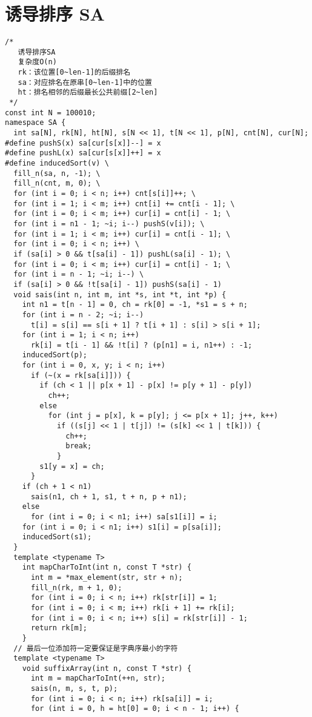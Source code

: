 \section{ 诱导排序 SA}
\begin{lstlisting}
/*
   诱导排序SA
   复杂度O(n)
   rk：该位置[0~len-1]的后缀排名
   sa：对应排名在原串[0~len-1]中的位置
   ht：排名相邻的后缀最长公共前缀[2~len]
 */
const int N = 100010;
namespace SA {
  int sa[N], rk[N], ht[N], s[N << 1], t[N << 1], p[N], cnt[N], cur[N];
#define pushS(x) sa[cur[s[x]]--] = x
#define pushL(x) sa[cur[s[x]]++] = x
#define inducedSort(v) \
  fill_n(sa, n, -1); \
  fill_n(cnt, m, 0); \
  for (int i = 0; i < n; i++) cnt[s[i]]++; \
  for (int i = 1; i < m; i++) cnt[i] += cnt[i - 1]; \
  for (int i = 0; i < m; i++) cur[i] = cnt[i] - 1; \
  for (int i = n1 - 1; ~i; i--) pushS(v[i]); \
  for (int i = 1; i < m; i++) cur[i] = cnt[i - 1]; \
  for (int i = 0; i < n; i++) \
  if (sa[i] > 0 && t[sa[i] - 1]) pushL(sa[i] - 1); \
  for (int i = 0; i < m; i++) cur[i] = cnt[i] - 1; \
  for (int i = n - 1; ~i; i--) \
  if (sa[i] > 0 && !t[sa[i] - 1]) pushS(sa[i] - 1)
  void sais(int n, int m, int *s, int *t, int *p) {
    int n1 = t[n - 1] = 0, ch = rk[0] = -1, *s1 = s + n;
    for (int i = n - 2; ~i; i--)
      t[i] = s[i] == s[i + 1] ? t[i + 1] : s[i] > s[i + 1];
    for (int i = 1; i < n; i++)
      rk[i] = t[i - 1] && !t[i] ? (p[n1] = i, n1++) : -1;
    inducedSort(p);
    for (int i = 0, x, y; i < n; i++)
      if (~(x = rk[sa[i]])) {
        if (ch < 1 || p[x + 1] - p[x] != p[y + 1] - p[y])
          ch++;
        else
          for (int j = p[x], k = p[y]; j <= p[x + 1]; j++, k++)
            if ((s[j] << 1 | t[j]) != (s[k] << 1 | t[k])) {
              ch++;
              break;
            }
        s1[y = x] = ch;
      }
    if (ch + 1 < n1)
      sais(n1, ch + 1, s1, t + n, p + n1);
    else
      for (int i = 0; i < n1; i++) sa[s1[i]] = i;
    for (int i = 0; i < n1; i++) s1[i] = p[sa[i]];
    inducedSort(s1);
  }
  template <typename T>
    int mapCharToInt(int n, const T *str) {
      int m = *max_element(str, str + n);
      fill_n(rk, m + 1, 0);
      for (int i = 0; i < n; i++) rk[str[i]] = 1;
      for (int i = 0; i < m; i++) rk[i + 1] += rk[i];
      for (int i = 0; i < n; i++) s[i] = rk[str[i]] - 1;
      return rk[m];
    }
  // 最后一位添加符一定要保证是字典序最小的字符
  template <typename T>
    void suffixArray(int n, const T *str) {
      int m = mapCharToInt(++n, str);
      sais(n, m, s, t, p);
      for (int i = 0; i < n; i++) rk[sa[i]] = i;
      for (int i = 0, h = ht[0] = 0; i < n - 1; i++) {

\end{lstlisting}
